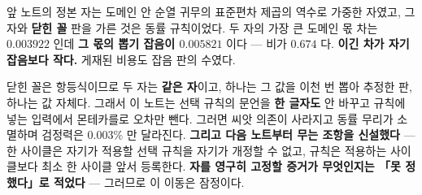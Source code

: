 
앞 노트의 정본 자는 도메인 안 순열 귀무의 표준편차 제곱의 역수로 가중한 자였고, 그 자와 \textbf{닫힌 꼴} 판을 가른 것은 동률 규칙이었다. 두 자의 가장 큰 도메인 몫 차는 $0.003922$ 인데 \textbf{그 몫의 뽑기 잡음이 $0.005821$} 이다 --- 비가 $0.674$ 다. \textbf{이긴 차가 자기 잡음보다 작다.} 게재된 비용도 잡음 판의 수였다.

닫힌 꼴은 항등식이므로 두 자는 \textbf{같은 자}이고, 하나는 그 값을 이천 번 뽑아 추정한 판, 하나는 값 자체다. 그래서 이 노트는 선택 규칙의 문언을 \textbf{한 글자도} 안 바꾸고 규칙에 넣는 입력에서 몬테카를로 오차만 뺀다. 그러면 씨앗 의존이 사라지고 동률 무리가 소멸하며 검정력은 $0.003\%$ 만 달라진다. \textbf{그리고 다음 노트부터 무는 조항을 신설했다} --- 한 사이클은 자기가 적용할 선택 규칙을 자기가 개정할 수 없고, 규칙은 적용하는 사이클보다 최소 한 사이클 앞서 등록한다. \textbf{자를 영구히 고정할 증거가 무엇인지는 「못 정했다」로 적었다} --- 그러므로 이 이동은 잠정이다.
